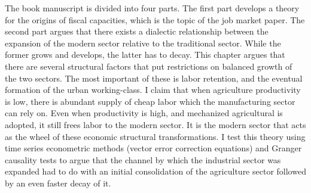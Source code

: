 \documentclass[11pt]{letter} %
\begin{document}
\begin{letter}{}
The book manuscript is divided into four parts. The first part develops a theory for the origins of fiscal capacities, which is the topic of the job market paper. The second part argues that there exists a dialectic relationship between the expansion of the modern sector relative to the traditional sector. While the former grows and develops, the latter has to decay. This chapter argues that there are several structural factors that put restrictions on balanced growth of the two sectors. The most important of these is labor retention, and the eventual formation of the urban working-class. I claim that when agriculture productivity is low, there is abundant supply of cheap labor which the manufacturing sector can rely on. Even when productivity is high, and mechanized agricultural is adopted, it still frees labor to the modern sector. It is the modern sector that acts as the wheel of these economic structural transformations. I test this theory using time series econometric methods (vector error correction equations) and Granger causality tests to argue that the channel by which the industrial sector was expanded had to do with an initial consolidation of the agriculture sector followed by an even faster decay of it. 



\end{letter}
\end{document}
